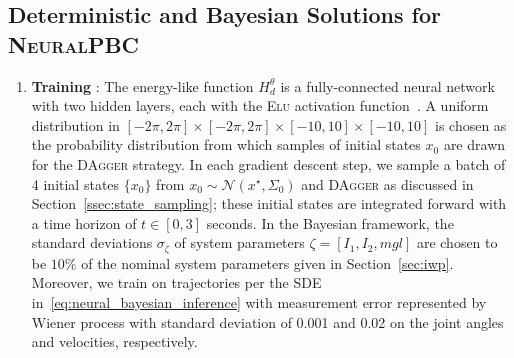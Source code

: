\subsection{Deterministic and Bayesian Solutions for \textsc{NeuralPBC}}

\begin{enumerate}
    \item \textbf{Training} : The energy-like function $H_d^\theta$ is a
    fully-connected neural network with two hidden layers, each with the
    \textsc{Elu} activation function~\cite{clevert2015fast}. 
    A uniform distribution in $[-2\pi, 2\pi] \times [-2\pi, 2\pi] \times [-10, 10]
    \times [-10, 10]$ is chosen as the probability distribution from which samples
    of initial states $x_0$ are drawn for the \textsc{DAgger} strategy.
    In each gradient descent step, we sample a batch of 4 initial states
    $\{x_0\}$ from $x_0 \sim \mathcal{N}(x^\star, \Sigma_0)$ and \textsc{DAgger}
    as discussed in Section~\ref{ssec:state_sampling}; these initial states are
    integrated forward with a time horizon of $t \in [0,3]$ seconds. 
    In the Bayesian framework, the standard deviations $\sigma_{\zeta}$ of system
    parameters $\zeta = [I_1, I_2, mgl]$ are chosen to be $10\%$ of the nominal system
    parameters given in Section~\ref{sec:iwp}.
    Moreover, we train on trajectories per the SDE
    in~\eqref{eq:neural_bayesian_inference} with measurement error represented
    by Wiener process with standard deviation of 0.001 and 0.02 on the joint
    angles and velocities, respectively.


\end{enumerate}
